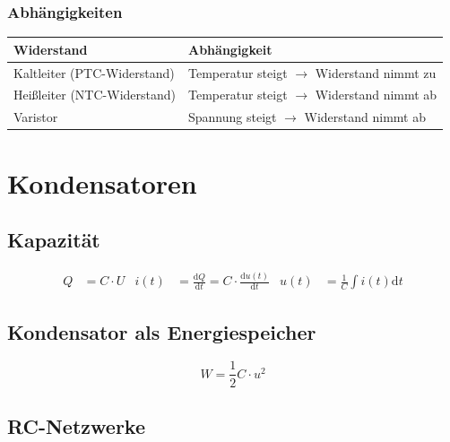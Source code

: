 		\subsubsection{Abhängigkeiten}
			\begin{table}[here]
			\begin{tabular}{ll}
			Widerstand & Abhängigkeit\\
			\toprule
			Kaltleiter (PTC-Widerstand) & Temperatur steigt $\rightarrow$ Widerstand nimmt zu\\
			\midrule
			Heißleiter (NTC-Widerstand) & Temperatur steigt $\rightarrow$ Widerstand nimmt ab\\
			\midrule
			Varistor & Spannung steigt $\rightarrow$ Widerstand nimmt ab\\
			\end{tabular}
			\end{table}
\section{Kondensatoren}
	\subsection{Kapazität}
		\begin{align*}
			Q&=C\cdot U & i(t)&=\frac{\mathrm{d}Q}{\mathrm{d}t}=C\cdot\frac{\mathrm{d}u(t)}{\mathrm{d}t} & u(t)&=\frac{1}{C}\int i(t)\mathrm{d}t
		\end{align*}
	\subsection{Kondensator als Energiespeicher}
		\[
			W=\frac{1}{2}C\cdot u^2
		\]
	
	\subsection{RC-Netzwerke}

